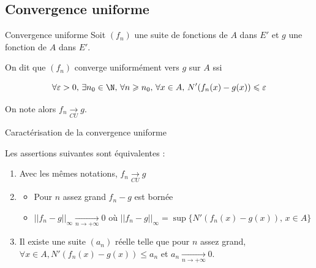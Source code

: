 \subsection{Convergence uniforme}

\begin{definition}{Convergence uniforme}{}
    Soit $(f_n)$ une suite de fonctions de $A$ dans $E'$ et $g$ une fonction de $A$ dans $E'$.

    On dit que $(f_n)$ converge uniformément vers $g$ sur $A$ ssi 
    
    \[\forall \varepsilon >0, \, \exists n_0 \in \N, \, \forall n \geqslant n_0, \, \forall x \in A, \, N'(f_n(x) - g(x) ) \leqslant \varepsilon\]

    On note alors $f_n \xrightarrow[CU]{} g$.
\end{definition}

\begin{proposition}{Caractérisation de la convergence uniforme}{}

    Les assertions suivantes sont équivalentes :
    \begin{enumerate}
        \item Avec les mêmes notations, $f_n \xrightarrow[CU]{} g$ 

        \item
        \begin{itemize}
            \item Pour $n$ assez grand $f_n - g$ est bornée 
            \item $\displaystyle || f_n - g ||_{\infty} \xrightarrow[n\to +\infty]{} 0$
            où $\displaystyle || f_n - g ||_{\infty} = \sup\{ N'(f_n(x) - g(x)), \, x \in A \}$
        \end{itemize}

        \item Il existe une suite $(a_n)$ réelle telle que pour $n$ assez grand, 
        $\forall x \in A, N'(f_n(x) - g(x)) \leqslant a_n$ et $a_n \xrightarrow[n\to +\infty]{} 0$.
    \end{enumerate}
\end{proposition}


